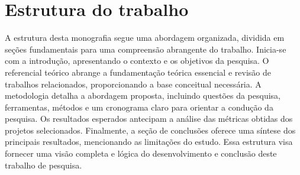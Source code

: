 \section{Estrutura do trabalho}
\label{sec:estruturaTrabalho}

A estrutura desta monografia segue uma abordagem organizada, dividida em seções fundamentais para uma compreensão abrangente do trabalho. Inicia-se com a introdução, apresentando o contexto e os objetivos da pesquisa. O referencial teórico abrange a fundamentação teórica essencial e revisão de trabalhos relacionados, proporcionando a base conceitual necessária. A metodologia detalha a abordagem proposta, incluindo questões da pesquisa, ferramentas, métodos e um cronograma claro para orientar a condução da pesquisa. Os resultados esperados antecipam a análise das métricas obtidas dos projetos selecionados. Finalmente, a seção de conclusões oferece uma síntese dos principais resultados, mencionando as limitações do estudo. Essa estrutura visa fornecer uma visão completa e lógica do desenvolvimento e conclusão deste trabalho de pesquisa.
